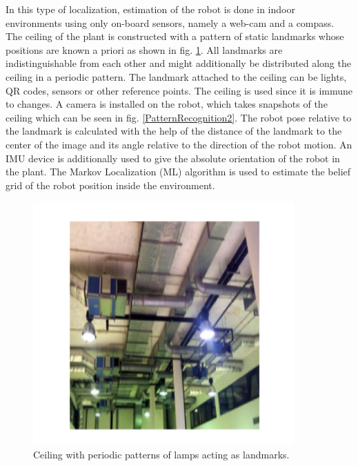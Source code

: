 In this type of localization, estimation of the robot is done in indoor environments using
only on-board sensors, namely a web-cam and a compass. The ceiling of the plant is constructed with a pattern of static landmarks whose positions are known a priori as shown in fig. \ref{Pattern Recognition}. All landmarks are indistinguishable from each other and might additionally be distributed along the ceiling in a periodic pattern. The landmark attached to the ceiling can be lights, QR codes, sensors or other reference points. The ceiling is used since it is immune to changes. A camera is installed on the robot, which takes snapshots of the ceiling which can be seen in fig. \ref{PatternRecognition2}. The robot pose relative to the landmark is calculated with the help of the distance of the landmark to the center of the image and its angle relative to the direction of the robot motion. An IMU device is additionally used to give the absolute orientation of the robot in the plant. The Markov Localization (ML) algorithm is used to estimate
the belief grid of the robot position inside the environment. 

\begin{figure}[!htbp]
	\centering
	\includegraphics[width = 10cm]{Pictures/PR.png}
	\caption{Ceiling with periodic patterns of lamps acting as landmarks. }
	\label{Pattern Recognition}
\end{figure}
